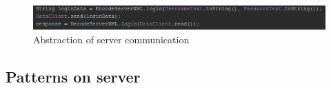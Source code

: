 \begin{figure}[H]
\centering
\includegraphics[width=\textwidth]{billeder/facadepattern.png}
\caption{Abstraction of server communication}
\label{fig:facadepattern}
\end{figure} 

\subsection{Patterns on server}

